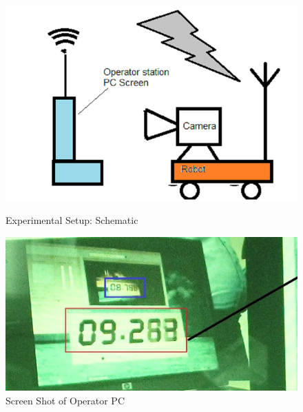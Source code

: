 \begin{figure}
	\begin{minipage}[t]{0.6\textwidth}
		\centering
		\includegraphics[width=\linewidth,scale=2]{Misc_end/fig/DelayExptSetup2}
		\caption{Experimental Setup: Schematic}\label{fig:ExptSetup}
	\end{minipage}
	\begin{minipage}[t]{0.7\textwidth}
		\centering
		\includegraphics[width=\linewidth]{Misc_end/fig/delayMeasureNew} 
		\caption{Screen Shot of Operator PC}\label{fig:ScreenShot}
	\end{minipage}
\end{figure}
